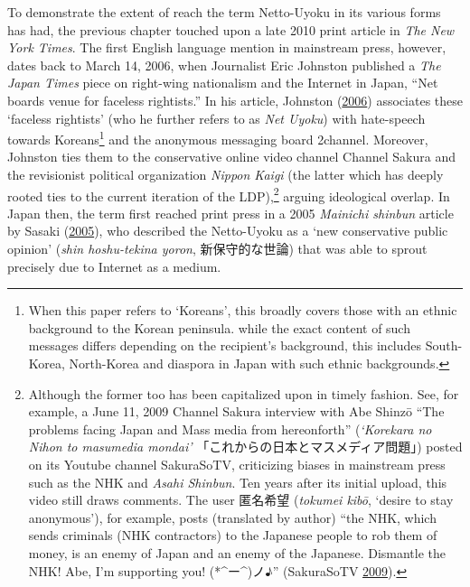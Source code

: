 \documentclass[10pt,british,A4paper,,openany]{memoir}
\begin{document}
To demonstrate the extent of reach the term Netto-Uyoku in its various
forms has had, the previous chapter touched upon a late 2010 print
article in \emph{The New York Times}. The first English language mention
in mainstream press, however, dates back to March 14, 2006, when
Journalist Eric Johnston published a \emph{The Japan Times} piece on
right-wing nationalism and the Internet in Japan, ``Net boards venue for
faceless rightists.'' In his article, Johnston
(\protect\hyperlink{ref-johnston_net_2006}{2006}) associates these
`faceless rightists' (who he further refers to as \emph{Net Uyoku}) with
hate-speech towards Koreans\footnote{When this paper refers to
  `Koreans', this broadly covers those with an ethnic background to the
  Korean peninsula. while the exact content of such messages differs
  depending on the recipient's background, this includes South-Korea,
  North-Korea and diaspora in Japan with such ethnic backgrounds.} and
the anonymous messaging board 2channel. Moreover, Johnston ties them to
the conservative online video channel Channel Sakura and the revisionist
political organization \emph{Nippon Kaigi} (the latter which has deeply
rooted ties to the current iteration of the LDP),\footnote{Although the
  former too has been capitalized upon in timely fashion. See, for
  example, a June 11, 2009 Channel Sakura interview with Abe Shinzō
  ``The problems facing Japan and Mass media from hereonforth''
  (\emph{`Korekara no Nihon to masumedia mondai'}
  「これからの日本とマスメディア問題」) posted on its Youtube channel
  SakuraSoTV, criticizing biases in mainstream press such as the NHK and
  \emph{Asahi Shinbun}. Ten years after its initial upload, this video
  still draws comments. The user 匿名希望 (\emph{tokumei kibō}, `desire
  to stay anonymous'), for example, posts (translated by author) ``the
  NHK, which sends criminals (NHK contractors) to the Japanese people to
  rob them of money, is an enemy of Japan and an enemy of the Japanese.
  Dismantle the NHK! Abe, I'm supporting you! (*\^{}ー\^{})ノ♪''
  (SakuraSoTV \protect\hyperlink{ref-sakurasotv_eng._2009}{2009}).}
arguing ideological overlap. In Japan then, the term first reached print
press in a 2005 \emph{Mainichi shinbun} article by Sasaki
(\protect\hyperlink{ref-sasaki_netto-uyoku_2005}{2005}), who described
the Netto-Uyoku as a `new conservative public opinion' (\emph{shin
hoshu-tekina yoron}, 新保守的な世論) that was able to sprout precisely
due to Internet as a medium.
\end{document}
